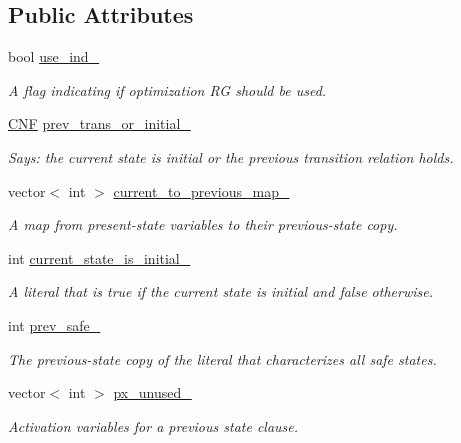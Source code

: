 \subsection*{Public Attributes}
\begin{DoxyCompactItemize}
\item 
bool \hyperlink{classPrevStateInfo_a87e1dd01468199a18b39ddc108bf4a70}{use\-\_\-ind\-\_\-}
\begin{DoxyCompactList}\small\item\em A flag indicating if optimization R\-G should be used. \end{DoxyCompactList}\item 
\hyperlink{classCNF}{C\-N\-F} \hyperlink{classPrevStateInfo_a3301f7d909263e78ef990173d69f7036}{prev\-\_\-trans\-\_\-or\-\_\-initial\-\_\-}
\begin{DoxyCompactList}\small\item\em Says\-: the current state is initial or the previous transition relation holds. \end{DoxyCompactList}\item 
vector$<$ int $>$ \hyperlink{classPrevStateInfo_a98e6e65c17d5d1e535d509816b466257}{current\-\_\-to\-\_\-previous\-\_\-map\-\_\-}
\begin{DoxyCompactList}\small\item\em A map from present-\/state variables to their previous-\/state copy. \end{DoxyCompactList}\item 
int \hyperlink{classPrevStateInfo_a720892a8c0030208df1e81dfc1cc962e}{current\-\_\-state\-\_\-is\-\_\-initial\-\_\-}
\begin{DoxyCompactList}\small\item\em A literal that is true if the current state is initial and false otherwise. \end{DoxyCompactList}\item 
int \hyperlink{classPrevStateInfo_a4c8813c99307790e87b994639cade0ed}{prev\-\_\-safe\-\_\-}
\begin{DoxyCompactList}\small\item\em The previous-\/state copy of the literal that characterizes all safe states. \end{DoxyCompactList}\item 
vector$<$ int $>$ \hyperlink{classPrevStateInfo_a4e8557c4f0b12df62279daca0999b7bb}{px\-\_\-unused\-\_\-}
\begin{DoxyCompactList}\small\item\em Activation variables for a previous state clause. \end{DoxyCompactList}\item 

\end{DoxyCompactItemize}
